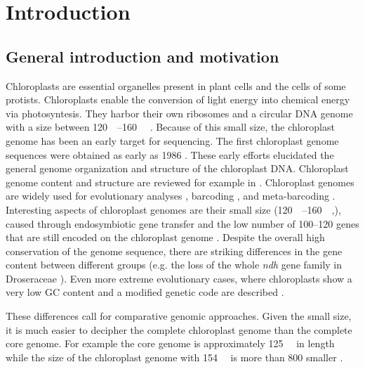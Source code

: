 \documentclass{bmcart}
\newcommand{\genename}[1]{\textit{#1}}
\begin{document}

\section*{Introduction}
\subsection*{General introduction and motivation}
Chloroplasts are essential organelles present in plant cells and the cells of some protists. Chloroplasts enable the conversion of light energy into chemical energy via photosyntesis. They harbor their own ribosomes and a circular DNA genome with a size between \SIrange{120}{160}{\kilo\basepair} \cite{palmer_1985}.
Because of this small size, the chloroplast genome has been an early target for sequencing.
The first chloroplast genome sequences were obtained as early as 1986 \cite{ohyama_chloroplast_1986,shinozaki_complete_1986}.
These early efforts elucidated the general genome organization and structure of the chloroplast DNA. 
Chloroplast genome content and structure are reviewed for example in \cite{wicke_evolution_2011,green_chloroplast_2011}.
Chloroplast genomes are widely used for evolutionary analyses \cite{martin_plastid_2010,xiao-ming_inferring_2017}, barcoding \cite{kress_use_2005,hollingsworth_dna_2009,de_vere_dna_2015}, and meta-barcoding \cite{bell_review_2016,deiner_environmental_2017}.
Interesting aspects of chloroplast genomes are their small size (\SIrange{120}{160}{\kilo\basepair},\cite{palmer_1985}), caused through endosymbiotic gene transfer \cite{martin_evolutionary_2002,timmis_endosymbiotic_2004} and the low number of \numrange{100}{120} genes that are still encoded on the chloroplast genome \cite{wicke_evolution_2011}.
Despite the overall high conservation of the genome sequence, there are striking differences in the gene content between different groups (e.g. the loss of the whole \genename{ndh} gene family in Droseraceae \cite{nevill_plastome-wide_2019}). Even more extreme evolutionary cases, where chloroplasts show a very low GC content and a modified genetic code are described \cite{su_novel_2019}.

These differences call for comparative genomic approaches.
Given the small size, it is much easier to decipher the complete chloroplast genome than the complete core genome. For example the  core genome is approximately \SI{125}{\mega\basepair} in length \cite{schmuths2004,cao2011} while the size of the  chloroplast genome with \SI{154}{\kilo\basepair} is more than \SI{800}{\times} smaller \cite{sato1999}.
\end{document}
